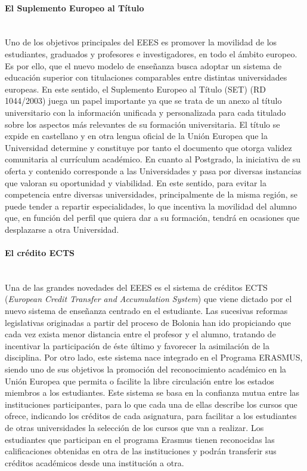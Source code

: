 \paragraph{El Suplemento Europeo al Título\\\\}\label{sec:set}

Uno de los objetivos principales del EEES es promover la movilidad de los estudiantes, graduados y profesores e investigadores, en todo el ámbito europeo. Es por ello, que el nuevo modelo de enseñanza busca adoptar un sistema de educación superior con titulaciones comparables entre distintas universidades europeas. En este sentido, el Suplemento Europeo al Título (SET) (RD 1044/2003) juega un papel importante ya que se trata de un anexo al título universitario con la información unificada y personalizada para cada titulado sobre los aspectos más relevantes de su formación universitaria. El título se expide en castellano y en otra lengua oficial de la Unión Europea que la Universidad determine y constituye por tanto el documento que otorga validez comunitaria al currículum académico. En cuanto al Postgrado, la iniciativa de su oferta y contenido corresponde a las Universidades y pasa por diversas instancias que valoran su oportunidad y viabilidad. En este sentido, para evitar la competencia entre diversas universidades, principalmente de la misma región, se puede tender a repartir especialidades, lo que incentiva la movilidad del alumno que, en función del perfil que quiera dar a su formación, tendrá en ocasiones que desplazarse a otra Universidad.

\paragraph{El crédito ECTS\\\\} \label{sec:ects}

Una de las grandes novedades del EEES es el sistema de créditos ECTS (\emph{European Credit Transfer and Accumulation System}) que viene dictado por el nuevo sistema de enseñanza centrado en el estudiante. Las sucesivas reformas legislativas originadas a partir del proceso de Bolonia han ido propiciando que cada vez exista menor distancia entre el profesor y el alumno, tratando de incentivar la participación de éste último y favorecer la asimilación de la disciplina. Por otro lado, este sistema nace integrado en el Programa ERASMUS, siendo uno de sus objetivos la promoción del reconocimiento académico en la Unión Europea que permita o facilite la libre circulación entre los estados miembros a los estudiantes. Este sistema se basa en la confianza mutua entre las instituciones participantes, para lo que cada una de ellas describe los cursos que ofrece, indicando los créditos de cada asignatura, para facilitar a los estudiantes de otras universidades la selección de los cursos que van a realizar. Los estudiantes que participan en el programa Erasmus tienen reconocidas las calificaciones obtenidas en otra de las instituciones y podrán transferir sus créditos académicos desde una institución a otra.

